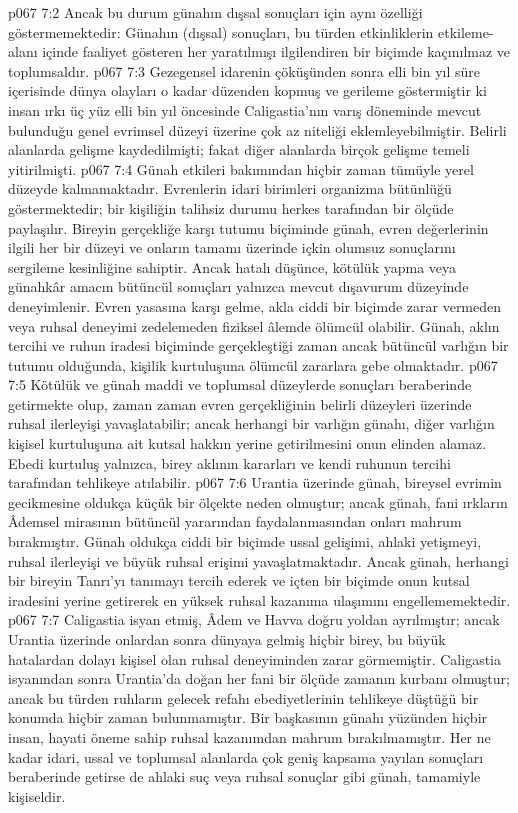 \vs p067 7:2 Ancak bu durum günahın dışsal sonuçları için aynı özelliği göstermemektedir: Günahın (dışsal) sonuçları, bu türden etkinliklerin etkileme\hyp{}alanı içinde faaliyet gösteren her yaratılmışı ilgilendiren bir biçimde kaçınılmaz ve toplumsaldır.
\vs p067 7:3 Gezegensel idarenin çöküşünden sonra elli bin yıl süre içerisinde dünya olayları o kadar düzenden kopmuş ve gerileme göstermiştir ki insan ırkı üç yüz elli bin yıl öncesinde Caligastia’nın varış döneminde mevcut bulunduğu genel evrimsel düzeyi üzerine çok az niteliği eklemleyebilmiştir. Belirli alanlarda gelişme kaydedilmişti; fakat diğer alanlarda birçok gelişme temeli yitirilmişti.
\vs p067 7:4 Günah etkileri bakımından hiçbir zaman tümüyle yerel düzeyde kalmamaktadır. Evrenlerin idari birimleri organizma bütünlüğü göstermektedir; bir kişiliğin talihsiz durumu herkes tarafından bir ölçüde paylaşılır. Bireyin gerçekliğe karşı tutumu biçiminde günah, evren değerlerinin ilgili her bir düzeyi ve onların tamamı üzerinde içkin olumsuz sonuçlarını sergileme kesinliğine sahiptir. Ancak hatalı düşünce, kötülük yapma veya günahkâr amacın bütüncül sonuçları yalnızca mevcut dışavurum düzeyinde deneyimlenir. Evren yasasına karşı gelme, akla ciddi bir biçimde zarar vermeden veya ruhsal deneyimi zedelemeden fiziksel âlemde ölümcül olabilir. Günah, aklın tercihi ve ruhun iradesi biçiminde gerçekleştiği zaman ancak bütüncül varlığın bir tutumu olduğunda, kişilik kurtuluşuna ölümcül zararlara gebe olmaktadır.
\vs p067 7:5 Kötülük ve günah maddi ve toplumsal düzeylerde sonuçları beraberinde getirmekte olup, zaman zaman evren gerçekliğinin belirli düzeyleri üzerinde ruhsal ilerleyişi yavaşlatabilir; ancak herhangi bir varlığın günahı, diğer varlığın kişisel kurtuluşuna ait kutsal hakkın yerine getirilmesini onun elinden alamaz. Ebedi kurtuluş yalnızca, birey aklının kararları ve kendi ruhunun tercihi tarafından tehlikeye atılabilir.
\vs p067 7:6 Urantia üzerinde günah, bireysel evrimin gecikmesine oldukça küçük bir ölçekte neden olmuştur; ancak günah, fani ırkların Âdemsel mirasının bütüncül yararından faydalanmasından onları mahrum bırakmıştır. Günah oldukça ciddi bir biçimde ussal gelişimi, ahlaki yetişmeyi, ruhsal ilerleyişi ve büyük ruhsal erişimi yavaşlatmaktadır. Ancak günah, herhangi bir bireyin Tanrı’yı tanımayı tercih ederek ve içten bir biçimde onun kutsal iradesini yerine getirerek en yüksek ruhsal kazanıma ulaşımını engellememektedir.
\vs p067 7:7 Caligastia isyan etmiş, Âdem ve Havva doğru yoldan ayrılmıştır; ancak Urantia üzerinde onlardan sonra dünyaya gelmiş hiçbir birey, bu büyük hatalardan dolayı kişisel olan ruhsal deneyiminden zarar görmemiştir. Caligastia isyanından sonra Urantia’da doğan her fani bir ölçüde zamanın kurbanı olmuştur; ancak bu türden ruhların gelecek refahı ebediyetlerinin tehlikeye düştüğü bir konumda hiçbir zaman bulunmamıştır. Bir başkasının günahı yüzünden hiçbir insan, hayati öneme sahip ruhsal kazanımdan mahrum bırakılmamıştır. Her ne kadar idari, ussal ve toplumsal alanlarda çok geniş kapsama yayılan sonuçları beraberinde getirse de ahlaki suç veya ruhsal sonuçlar gibi günah, tamamiyle kişiseldir.
